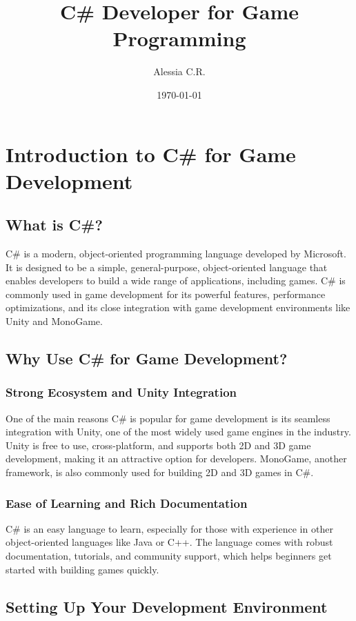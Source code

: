 \documentclass[a4paper,12pt]{book}
\title{C\# Developer for Game Programming}
\author{Alessia C.R.}
\date{\today}
\begin{document}
	
	\maketitle
	\tableofcontents
	
	\chapter{Introduction to C\# for Game Development}
	\section{What is C\#?}
	C\# is a modern, object-oriented programming language developed by Microsoft. It is designed to be a simple, general-purpose, object-oriented language that enables developers to build a wide range of applications, including games. C\# is commonly used in game development for its powerful features, performance optimizations, and its close integration with game development environments like Unity and MonoGame.
	
	\section{Why Use C\# for Game Development?}
	\subsection{Strong Ecosystem and Unity Integration}
	One of the main reasons C\# is popular for game development is its seamless integration with Unity, one of the most widely used game engines in the industry. Unity is free to use, cross-platform, and supports both 2D and 3D game development, making it an attractive option for developers. MonoGame, another framework, is also commonly used for building 2D and 3D games in C\#.
	
	\subsection{Ease of Learning and Rich Documentation}
	C\# is an easy language to learn, especially for those with experience in other object-oriented languages like Java or C++. The language comes with robust documentation, tutorials, and community support, which helps beginners get started with building games quickly.
	
	\section{Setting Up Your Development Environment}
\end{document}
